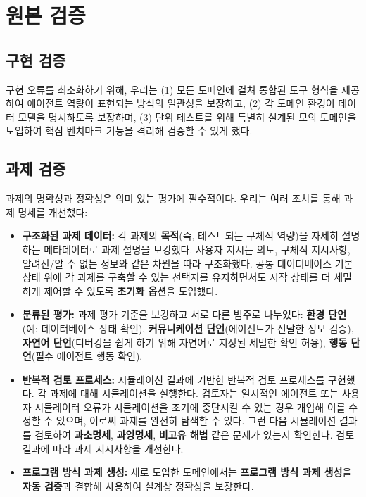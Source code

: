 \section{원본 \bench 검증}
\label{app:verify_tau}

\subsection{구현 검증}

구현 오류를 최소화하기 위해, 우리는 (1) 모든 도메인에 걸쳐 통합된 도구 형식을 제공하여 에이전트 역량이 표현되는 방식의 일관성을 보장하고, (2) 각 도메인 환경이 데이터 모델을 명시하도록 보장하며, (3) 단위 테스트를 위해 특별히 설계된 모의 도메인을 도입하여 핵심 벤치마크 기능을 격리해 검증할 수 있게 했다.

\subsection{과제 검증}

과제의 명확성과 정확성은 의미 있는 평가에 필수적이다. 우리는 여러 조치를 통해 과제 명세를 개선했다:
\begin{itemize}
    \item \textbf{구조화된 과제 데이터:} 각 과제의 \textbf{목적}(즉, 테스트되는 구체적 역량)을 자세히 설명하는 메타데이터로 과제 설명을 보강했다. 사용자 지시는 의도, 구체적 지시사항, 알려진/알 수 없는 정보와 같은 차원을 따라 구조화했다. 공통 데이터베이스 기본 상태 위에 각 과제를 구축할 수 있는 선택지를 유지하면서도 시작 상태를 더 세밀하게 제어할 수 있도록 \textbf{초기화 옵션}을 도입했다.
    \item \textbf{분류된 평가:} 과제 평가 기준을 보강하고 서로 다른 범주로 나누었다: \textbf{환경 단언}(예: 데이터베이스 상태 확인), \textbf{커뮤니케이션 단언}(에이전트가 전달한 정보 검증), \textbf{자연어 단언}(디버깅을 쉽게 하기 위해 자연어로 지정된 세밀한 확인 허용), \textbf{행동 단언}(필수 에이전트 행동 확인).
    \item \textbf{반복적 검토 프로세스:} 시뮬레이션 결과에 기반한 반복적 검토 프로세스를 구현했다. 각 과제에 대해 시뮬레이션을 실행한다. 검토자는 일시적인 에이전트 또는 사용자 시뮬레이터 오류가 시뮬레이션을 조기에 중단시킬 수 있는 경우 개입해 이를 수정할 수 있으며, 이로써 과제를 완전히 탐색할 수 있다. 그런 다음 시뮬레이션 결과를 검토하여 \textbf{과소명세}, \textbf{과잉명세}, \textbf{비고유 해법} 같은 문제가 있는지 확인한다. 검토 결과에 따라 과제 지시사항을 개선한다.
    \item \textbf{프로그램 방식 과제 생성:} 새로 도입한 도메인에서는 \textbf{프로그램 방식 과제 생성}을 \textbf{자동 검증}과 결합해 사용하여 설계상 정확성을 보장한다.
\end{itemize}
